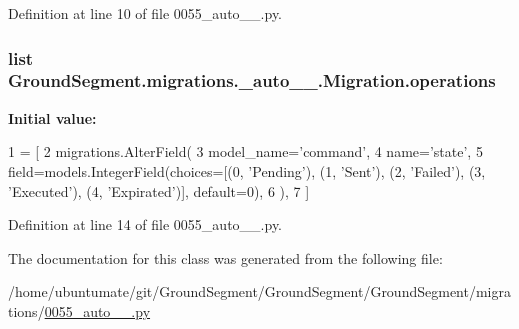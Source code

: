 Definition at line 10 of file 0055\+\_\+auto\+\_\+\_.\+py.

\hypertarget{class_ground_segment_1_1migrations_1_10055__auto__20170327__1403_1_1_migration_a38b2cb6f693b60c560e46e6b1a955fc4}{}
\subsubsection[{operations}]{\setlength{\rightskip}{0pt plus 5cm}list Ground\+Segment.\+migrations.\+\_\+auto\+\_\+\_.\+Migration.\+operations\hspace{0.3cm}{\ttfamily [static]}}\label{class_ground_segment_1_1migrations_1_10055__auto__20170327__1403_1_1_migration_a38b2cb6f693b60c560e46e6b1a955fc4}
{\bfseries Initial value\+:}
\begin{DoxyCode}
1 = [
2         migrations.AlterField(
3             model\_name=\textcolor{stringliteral}{'command'},
4             name=\textcolor{stringliteral}{'state'},
5             field=models.IntegerField(choices=[(0, \textcolor{stringliteral}{'Pending'}), (1, \textcolor{stringliteral}{'Sent'}), (2, \textcolor{stringliteral}{'Failed'}), (3, \textcolor{stringliteral}{'Executed'}),
       (4, \textcolor{stringliteral}{'Expirated'})], default=0),
6         ),
7     ]
\end{DoxyCode}


Definition at line 14 of file 0055\+\_\+auto\+\_\+\_.\+py.



The documentation for this class was generated from the following file\+:\begin{DoxyCompactItemize}
\item 
/home/ubuntumate/git/\+Ground\+Segment/\+Ground\+Segment/\+Ground\+Segment/migrations/\hyperlink{0055__auto__20170327__1403_8py}{0055\+\_\+auto\+\_\+\_.\+py}\end{DoxyCompactItemize}
